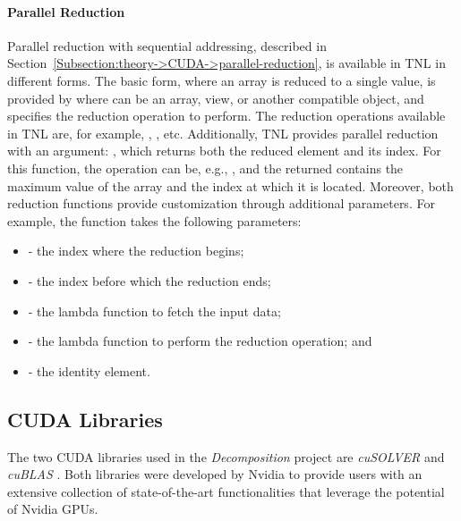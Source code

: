 \paragraph{Parallel Reduction} Parallel reduction with sequential addressing, described in Section~\ref{Subsection:theory->CUDA->parallel-reduction}, is available in TNL in different forms. The basic form, where an array is reduced to a single value, is provided by  where  can be an array, view, or another compatible object, and  specifies the reduction operation to perform. The reduction operations available in TNL are, for example, , , etc. Additionally, TNL provides parallel reduction with an argument: , which returns both the reduced element and its index. For this function, the  operation can be, e.g., , and the returned  contains the maximum value of the array and the index at which it is located. Moreover, both reduction functions provide customization through additional parameters. For example, the  function takes the following parameters:

\begin{itemize}
	\item {} - the index where the reduction begins;
	\item {} - the index before which the reduction ends;
	\item {} - the lambda function to fetch the input data;
	\item {} - the lambda function to perform the reduction operation; and
	\item {} - the identity element.
\end{itemize}



\subsection{CUDA Libraries}
The two CUDA libraries used in the \textit{Decomposition} project are \textit{cuSOLVER} \cite{5D33zKi5iStCty0r} and \textit{cuBLAS} \cite{h9oJtLLHaTFaL3ME}. Both libraries were developed by Nvidia to provide users with an extensive collection of state-of-the-art functionalities that leverage the potential of Nvidia GPUs.

